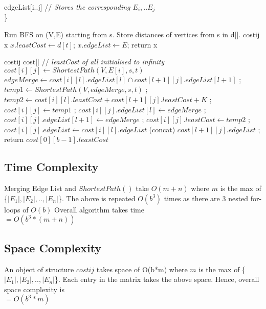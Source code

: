 \documentclass{article}
\begin{document}
\hspace*{1cm} edgeList[i..j] // \emph{Stores the corresponding $E_i, .. E_j$}\\
\}
\vspace*{0.2cm}
\begin{algorithmic}[1]
\State Run BFS on (V,E) starting from s.
\State Store distances of vertices from s in d[].
\State costij x
\State $x.leastCost \gets  d[t]$;
\State $x.edgeList \gets E $;
\State return x
\EndProcedure
\end{algorithmic} 
\vspace*{0.2cm}
\begin{algorithmic}[1]
\State costij cost[] // \emph{leastCost of all initialised to infinity}
\State $cost[i][j] \gets ShortestPath(V,E[i],s,t)$
\Else
{}
\State $edgeMerge \gets cost[i][l].edgeList[l] \cap cost[l+1][j].edgeList[l+1]$ ;
\State $temp1 \gets ShortestPath(V,edgeMerge,s,t)$ ;
\State $temp2 \gets  cost[i][l].leastCost + cost[l+1][j].leastCost + K$ ;
\State $cost[i][j] \gets temp1$ ;
\State $cost[i][j].edgeList[l] \gets edgeMerge$ ;
\State $cost[i][j].edgeList[l+1] \gets edgeMerge$ ;
\Else
\State $cost[i][j].leastCost \gets temp2$ ;
\State $cost[i][j].edgeList \gets cost[i][l].edgeList$ (concat) $cost[l+1][j].edgeList $ ;
\EndIf
\EndFor
\EndIf
\EndFor
\EndFor
\State return $cost[0][b-1].leastCost$
\EndProcedure
\end{algorithmic}

\subsection{Time Complexity}
  Merging Edge List and $ShortestPath()$ take $O(m+n)$ where $m$ is the max of \{$|E_1|, |E_2|,.., |E_n|$\}. 
  The above is repeated $O(b^3)$ times as there are $3$ nested for-loops of $O(b)$
  Overall algorithm takes time \\
             		$ = O(b^3 * (m+n))$
\subsection{Space Complexity}
An object of structure $costij$ takes space of O(b*m) where $m$ is the max of \{$|E_1|, |E_2|,.., |E_n|$\}.
Each entry in the matrix takes the above space. Hence, overall space complexity is \\
					$ = O(b^3 * m)$
\end{document}

